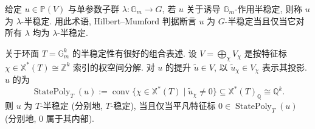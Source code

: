 \begin{remark}[其他表述]\label{src:8.4.6}
给定 $u\in\mathbb P(V)$ 与单参数子群 $\lambda:\mathbb G_m\to G$, 若 $u$ 关于诱导 $\mathbb G_m$-作用半稳定, 则称 $u$ 为 $\lambda$-半稳定. 用此术语, Hilbert--Mumford 判据断言 $u$ 为 $G$-半稳定当且仅当它对所有 $\lambda$ 均为 $\lambda$-半稳定.

关于环面 $T=\mathbb G_m^k$ 的半稳定性有很好的组合表述. 设 $V=\bigoplus_\chi V_\chi$ 是按特征标 $\chi\in\mathbb X^*(T)\cong\mathbb Z^k$ 索引的权空间分解. 对 $u$ 的提升 $\widetilde u\in V$, 以 $\widetilde u_\chi\in V_\chi$ 表示其投影. $u$ 的为
\[
\operatorname{StatePoly}_T(u):=\operatorname{conv}\{\chi\in\mathbb X^*(T)\mid\widetilde u_\chi\ne0\}
\subseteq\mathbb X^*(T)_{\mathbb Q}\cong\mathbb Q^k.
\]
则 $u$ 为 $T$-半稳定 (分别地, $T$-稳定), 当且仅当平凡特征标 $0\in\operatorname{StatePoly}_T(u)$ (分别地, $0$ 属于其内部).
\end{remark}
